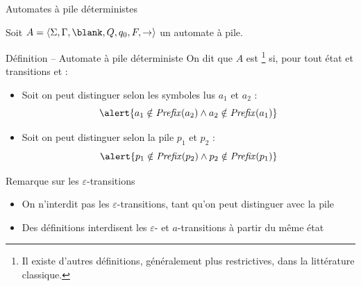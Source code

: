 
\begingroup

\begin{frame}{Automates à pile déterministes}

  Soit $A = \langle \Sigma, \Gamma, \blank, Q, q_0, F, \rightarrow \rangle$ un automate à pile.

  \begin{block}{Définition -- Automate à pile déterministe}
    On dit que $A$ est \footnote{Il existe d'autres définitions, généralement plus restrictives, dans la littérature classique.} si, 
    pour tout état  et transitions 
      et  :
      \begin{itemize}
      \item\vspace{2mm} Soit on peut distinguer selon les symboles lus $a_1$ et $a_2$ :
        $$\alert{a_1 \notin \mathit{Prefix}(a_2) \land a_2 \notin \mathit{Prefix}(a_1)}$$
      \item Soit on peut distinguer selon la pile  $p_1$ et $p_2$ :
        $$\alert{p_1 \notin \mathit{Prefix}(p_2) \land p_2 \notin \mathit{Prefix}(p_1)}$$
      \end{itemize}
  \end{block}

  \begin{block}{Remarque sur les $\varepsilon$-transitions}
    \begin{itemize}
    \item On n'interdit pas les $\varepsilon$-transitions, tant qu'on peut distinguer avec la pile
    \item Des définitions interdisent les $\varepsilon$- et $a$-transitions à partir du même état
    \end{itemize}
  \end{block}

\end{frame}

\endgroup
\endinput
